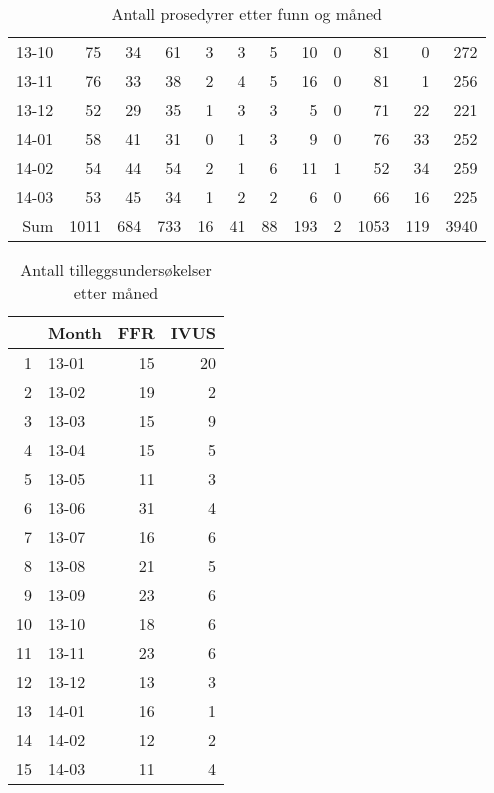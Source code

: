 \documentclass[presentation,xcolor=pdftex,dvipsnames,table]{beamer}
\begin{document}
\begin{frame}
\begin{tiny}
\begin{table}[ht]
\begin{tabular}{rrrrrrrrrrrr}
  13-10 & 75 & 34 & 61 & 3 & 3 & 5 & 10 & 0 & 81 & 0 & 272 \\ 
  13-11 & 76 & 33 & 38 & 2 & 4 & 5 & 16 & 0 & 81 & 1 & 256 \\ 
  13-12 & 52 & 29 & 35 & 1 & 3 & 3 & 5 & 0 & 71 & 22 & 221 \\ 
  14-01 & 58 & 41 & 31 & 0 & 1 & 3 & 9 & 0 & 76 & 33 & 252 \\ 
  14-02 & 54 & 44 & 54 & 2 & 1 & 6 & 11 & 1 & 52 & 34 & 259 \\ 
  14-03 & 53 & 45 & 34 & 1 & 2 & 2 & 6 & 0 & 66 & 16 & 225 \\ 
  Sum & 1011 & 684 & 733 & 16 & 41 & 88 & 193 & 2 & 1053 & 119 & 3940 \\ 
   \bottomrule
\end{tabular}
\caption{Antall prosedyrer etter funn og måned} 
\end{table}\end{tiny}
\end{frame}




\begin{frame}
\begin{tiny}
\begin{table}[ht]
\centering
\begin{tabular}{rlrr}
  \toprule
 & Month & FFR & IVUS \\ 
  \midrule
1 & 13-01 & 15 & 20 \\ 
  2 & 13-02 & 19 & 2 \\ 
  3 & 13-03 & 15 & 9 \\ 
  4 & 13-04 & 15 & 5 \\ 
  5 & 13-05 & 11 & 3 \\ 
  6 & 13-06 & 31 & 4 \\ 
  7 & 13-07 & 16 & 6 \\ 
  8 & 13-08 & 21 & 5 \\ 
  9 & 13-09 & 23 & 6 \\ 
  10 & 13-10 & 18 & 6 \\ 
  11 & 13-11 & 23 & 6 \\ 
  12 & 13-12 & 13 & 3 \\ 
  13 & 14-01 & 16 & 1 \\ 
  14 & 14-02 & 12 & 2 \\ 
  15 & 14-03 & 11 & 4 \\ 
   \bottomrule
\end{tabular}
\caption{Antall tilleggsundersøkelser etter måned} 
\end{table}\end{tiny}
\end{frame}
\end{document}
